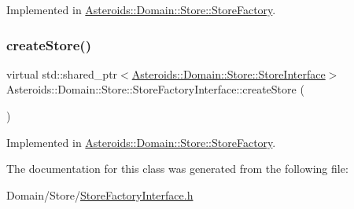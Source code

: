 Implemented in \hyperlink{classAsteroids_1_1Domain_1_1Store_1_1StoreFactory_a7c359274ea360991c612b3cdb87df2a2}{Asteroids\+::\+Domain\+::\+Store\+::\+Store\+Factory}.

\mbox{\label{classAsteroids_1_1Domain_1_1Store_1_1StoreFactoryInterface_a90c8a34020605c4c2e311e0997677298}} 
\subsubsection{\texorpdfstring{create\+Store()}{createStore()}}
{\footnotesize\ttfamily virtual std\+::shared\+\_\+ptr$<$\hyperlink{classAsteroids_1_1Domain_1_1Store_1_1StoreInterface}{Asteroids\+::\+Domain\+::\+Store\+::\+Store\+Interface}$>$ Asteroids\+::\+Domain\+::\+Store\+::\+Store\+Factory\+Interface\+::create\+Store (\begin{DoxyParamCaption}{ }\end{DoxyParamCaption})\hspace{0.3cm}{\ttfamily [pure virtual]}}



Implemented in \hyperlink{classAsteroids_1_1Domain_1_1Store_1_1StoreFactory_a5717439d93cf9fd0e799c9dd748804fd}{Asteroids\+::\+Domain\+::\+Store\+::\+Store\+Factory}.



The documentation for this class was generated from the following file\+:\begin{DoxyCompactItemize}
\item 
Domain/\+Store/\hyperlink{StoreFactoryInterface_8h}{Store\+Factory\+Interface.\+h}\end{DoxyCompactItemize}
